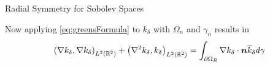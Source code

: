 \begin{chapter}{Radial Symmetry for Sobolev Spaces}
\begin{com}
%
%

Now applying \eqref{eq:greensFormula} to $k_\delta$ with $\Omega_n$ and $\gamma_n$ results in 
\begin{align}
  \left(\nabla k_\delta, \nabla k_\delta \right)_{L^2(\mathbb R^2)} + \left(\nabla^2 k_\delta, k_\delta \right)_{L^2(\mathbb R^2)}
  &= \int_{\partial \Omega_R} \nabla k_\delta \cdot \mbox{\boldmath$n$} \overline k_\delta d\gamma  \nonumber \\ 
  \label{eq:greensBoundary}
\end{align}


\end{com}
\end{chapter}
